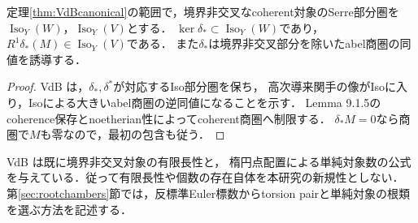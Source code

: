 \begin{proposition}[tiltの差は境界非交叉部分に集中する]\label{prop:boundarydefect}
定理\ref{thm:VdBcanonical}の範囲で，境界非交叉なcoherent対象のSerre部分圏を
$\operatorname{Iso}_Y(W)$，$\operatorname{Iso}_Y(V)$とする．
$\ker\delta_*\subset\operatorname{Iso}_Y(W)$であり，
$R^1\delta_*(M)\in\operatorname{Iso}_Y(V)$である．
また$\delta_*$は境界非交叉部分を除いたabel商圏の同値を誘導する．
\end{proposition}
\begin{proof}
VdB \cite[Theorem 9.1.9]{VdB}は，$\delta_*,\delta^*$が対応するIso部分圏を保ち，
高次導来関手の像がIsoに入り，Isoによる大きいabel商圏の逆同値になることを示す．
Lemma 9.1.5のcoherence保存とnoetherian性によってcoherent商圏へ制限する．
$\delta_*M=0$なら商圏で$M$も零なので，最初の包含も従う．
\end{proof}
\begin{remark}
VdB \cite[Theorem 11.2.1, Lemma 11.2.4]{VdB}は既に境界非交叉対象の有限長性と，
楕円点配置による単純対象数の公式を与えている．従って有限長性や個数の存在自体を本研究の新規性としない．
第\ref{sec:rootchambers}節では，反標準Euler標数からtorsion pairと単純対象の根類を選ぶ方法を記述する．
\end{remark}
